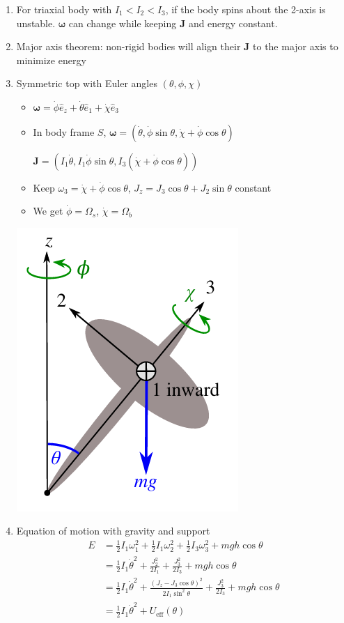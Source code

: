 \documentclass{article}
\theoremstyle{remark}
\theoremstyle{remark}
\begin{document}
\begin{enumerate}
\begin{itemize}
\begin{center}
        \end{center}
    \end{itemize}
    \item For triaxial body with $I_1<I_2<I_3$, if the body spins about the 2-axis is unstable. $\bm{\omega}$ can change while keeping $\bm{J}$ and energy constant.
    \item Major axis theorem: non-rigid bodies will align their $\bm{J}$ to the major axis to minimize energy
    \item Symmetric top with Euler angles $(\theta,\phi,\chi)$
    
    \begin{minipage}[b]{0.6\textwidth}
        \centering
        \begin{itemize}
            \item $\bm{\omega}=\dot\phi\hat{e}_z+\dot\theta\hat{e}_1+\dot\chi\hat{e}_3$
            \item In body frame $S$, $\bm{\omega}=(\dot\theta,\dot\phi\sin\theta,\dot\chi+\dot\phi\cos\theta)$
            
            $\bm{J}=(I_1\dot\theta,I_1\dot\phi\sin\theta,I_3(\dot\chi+\dot\phi\cos\theta))$
            \item Keep $\omega_3=\dot\chi+\dot\phi\cos\theta$, $J_z=J_3\cos\theta+J_2\sin\theta$ constant
            \item We get $\dot\phi=\Omega_s$, $\dot\chi=\Omega_b$
        \end{itemize}
    \end{minipage}
    \hfill
    \begin{minipage}[b]{0.39\textwidth}
        \centering
        \includegraphics[width=0.4\linewidth]{Lagrange's approach.png}
    \end{minipage}

    \item Equation of motion with gravity and support
    \begin{align*}
        E &= \frac{1}{2}I_1\omega_1^2 + \frac{1}{2}I_1\omega_2^2 + \frac{1}{2}I_3\omega_3^2+mgh\cos\theta\\
          &= \frac{1}{2}I_1\dot\theta^2 + \frac{J_2^2}{2I_1} + \frac{J_3^2}{2I_3}+mgh\cos\theta\\
          &= \frac{1}{2}I_1\dot\theta^2 + \frac{(J_z-J_3\cos\theta)^2}{2I_1\sin^2\theta} + \frac{J_3^2}{2I_3}+mgh\cos\theta\\
          &= \frac{1}{2}I_1\dot\theta^2 + U_{\mathrm{eff}}(\theta)
    \end{align*}


\end{enumerate}
\end{document}
